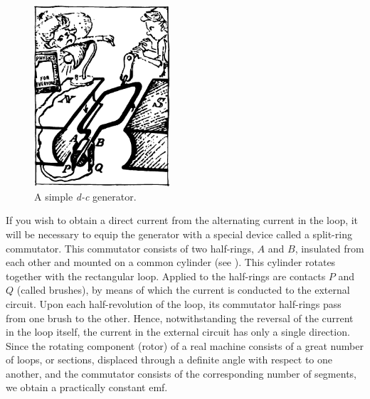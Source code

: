 \begin{figure}[!h]
\centering
\includegraphics[width=0.45\textwidth]{figures/fig-04-05.pdf}
\caption{A simple \emph{d-c} generator.}
\label{fig-4.5}
\end{figure}


If you wish to obtain a direct current from the alternating current in the loop, it will be necessary to equip the generator with a special device called a split-ring commutator. This commutator consists of two half-rings, $A$ and $B$, insulated from each other and mounted on a common cylinder (see ). This cylinder rotates together with the rectangular loop. Applied to the half-rings are contacts $P$ and $Q$ (called brushes), by means of which the current is conducted to the external circuit. Upon each half-revolution of the loop, its commutator half-rings pass from one brush to the other. Hence, notwithstanding the reversal of the current in the loop itself, the current in the external circuit has only a single direction. Since the rotating component (rotor) of a real machine consists of a great number of loops, or sections, displaced through a definite angle with respect to one another, and the commutator consists of the corresponding number of segments, we obtain a practically constant emf.

